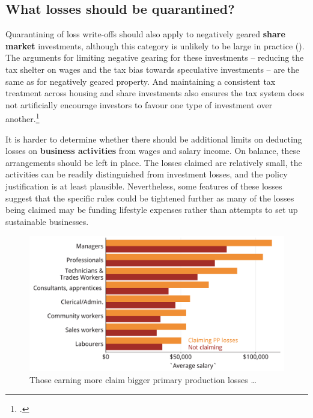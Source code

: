 \subsection{What losses should be quarantined?}
Quarantining of loss write-offs should also apply to negatively geared \textbf{share market} investments, although this category is unlikely to be large in practice (). The arguments for limiting negative gearing for these investments – reducing the tax shelter on wages and the tax bias towards speculative investments – are the same as for negatively geared property. And maintaining a consistent tax treatment across housing and share investments also ensures the tax system does not artificially encourage investors to favour one type of investment over another.\footcite[][133]{Commission2004a}


It is harder to determine whether there should be additional limits on deducting losses on \textbf{business activities} from wages and salary income.  On balance, these arrangements should be left in place. The losses claimed are relatively small, the activities can be readily distinguished from investment losses, and the policy justification is at least plausible. Nevertheless, some features of these losses suggest that the specific rules could be tightened further as many of the losses being claimed may be funding lifestyle expenses rather than attempts to set up sustainable businesses. 

\begin{figure}[t]
\caption{Those earning more claim bigger primary production losses \dots\label{fig:PP-losses-by-salary}}
\includegraphics[width=1.2\columnwidth, right]{CGT-NG-atlas/b5-palatino-atlas/PP-losers-salary-comparison-horiz-bar-1.pdf}
\end{figure}

